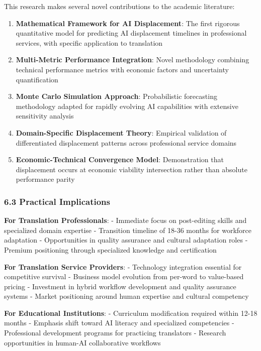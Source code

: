 \documentclass[12pt,a4paper]{article}
\begin{document}
{{{{{This research makes several novel contributions to the academic
literature:

\begin{enumerate}
\def\labelenumi{\arabic{enumi}.}
\item
  \textbf{Mathematical Framework for AI Displacement}: The first
  rigorous quantitative model for predicting AI displacement timelines
  in professional services, with specific application to translation
\item
  \textbf{Multi-Metric Performance Integration}: Novel methodology
  combining technical performance metrics with economic factors and
  uncertainty quantification
\item
  \textbf{Monte Carlo Simulation Approach}: Probabilistic forecasting
  methodology adapted for rapidly evolving AI capabilities with
  extensive sensitivity analysis
\item
  \textbf{Domain-Specific Displacement Theory}: Empirical validation of
  differentiated displacement patterns across professional service
  domains
\item
  \textbf{Economic-Technical Convergence Model}: Demonstration that
  displacement occurs at economic viability intersection rather than
  absolute performance parity
\end{enumerate}

\hypertarget{practical-implications}{%
\subsubsection{6.3 Practical
Implications}\label{practical-implications}}

\textbf{For Translation Professionals}: - Immediate focus on
post-editing skills and specialized domain expertise - Transition
timeline of 18-36 months for workforce adaptation - Opportunities in
quality assurance and cultural adaptation roles - Premium positioning
through specialized knowledge and certification

\textbf{For Translation Service Providers}: - Technology integration
essential for competitive survival - Business model evolution from
per-word to value-based pricing - Investment in hybrid workflow
development and quality assurance systems - Market positioning around
human expertise and cultural competency

\textbf{For Educational Institutions}: - Curriculum modification
required within 12-18 months - Emphasis shift toward AI literacy and
specialized competencies - Professional development programs for
practicing translators - Research opportunities in human-AI
collaborative workflows

}}}}}
\end{document}

